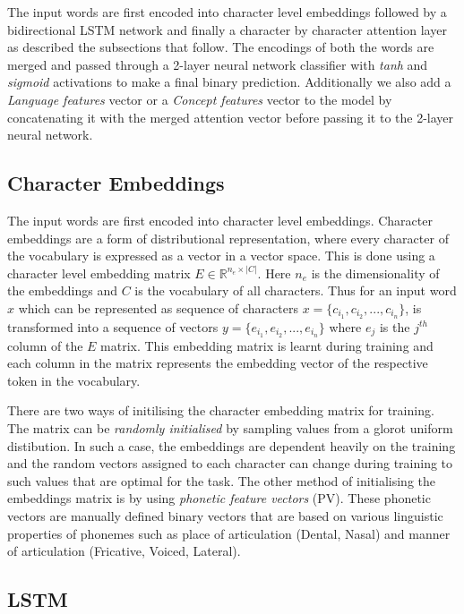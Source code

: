 \documentclass[11pt,letterpaper]{article}
\begin{document}
The input words are first encoded into character level embeddings followed by a bidirectional LSTM network and finally a character by character attention layer as described the subsections that follow. The encodings of both the words are merged and passed through a 2-layer neural network classifier with \textit{tanh} and \textit{sigmoid} activations to make a final binary prediction. Additionally we also add a \textit{Language features} vector or a \textit{Concept features} vector to the model by concatenating it with the merged attention vector before passing it to the 2-layer neural network.

\subsection{Character Embeddings}

The input words are first encoded into character level embeddings. Character embeddings are a form of distributional representation, where every character of the vocabulary is expressed as a vector in a vector space. This is done using a character level embedding matrix $E \in \mathbb{R}^{n_e \times |C|}$. Here $n_e$ is the dimensionality of the embeddings and $C$ is the vocabulary of all characters. Thus for an input word $x$ which can be represented as sequence of characters $x = \{c_{i_1}, c_{i_2}, ..., c_{i_n}\}$, is transformed into a sequence of vectors $y = \{e_{i_1}, e_{i_2}, ..., e_{i_n}\}$ where $e_j$ is the $j^{th}$ column of the $E$ matrix. This embedding matrix is learnt during training and each column in the matrix represents the embedding vector of the respective token in the vocabulary. 

There are two ways of initilising the character embedding matrix for training. The matrix can be \textit{randomly initialised} by sampling values from a glorot uniform distibution. In such a case, the embeddings are dependent heavily on the training and the random vectors assigned to each character can change during training to such values that are optimal for the task. The other method of initialising the embeddings matrix is by using \textit{phonetic feature vectors} (PV). These phonetic vectors are manually defined binary vectors that are based on various linguistic properties of phonemes such as place of articulation (Dental, Nasal) and manner of articulation (Fricative, Voiced, Lateral).

\subsection{LSTM}
\end{document}
